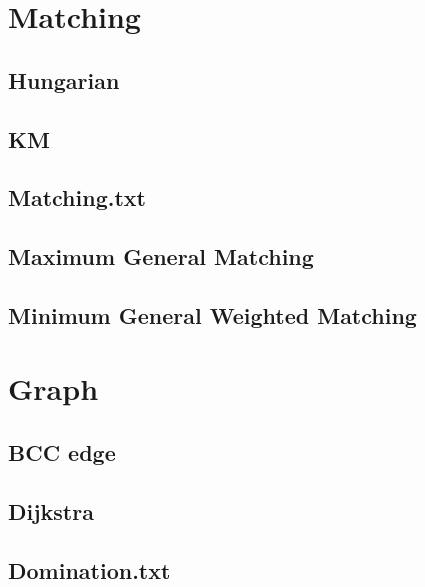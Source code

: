 \section{Matching}
	\subsection{Hungarian}
		
	\subsection{KM}
		
	\subsection{Matching.txt}
		
	\subsection{Maximum General Matching}
		
	\subsection{Minimum General Weighted Matching}
		


\section{Graph}
		
	\subsection{BCC edge}
		
	\subsection{Dijkstra}
		
%		
	\subsection{Domination.txt}
		
%		
